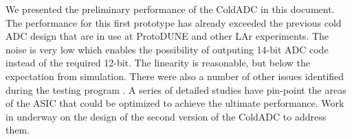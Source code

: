 \label{sec:7}


We presented the preliminary performance of the ColdADC in this document. The performance for this first prototype
has already exceeded the previous cold ADC design that are in use at ProtoDUNE and other LAr experiments. 
The noise is very low which enables the possibility of outputing 14-bit ADC code instead of the required 12-bit.
The linearity is reasonable, but below the expectation from simulation. There were also a number of other 
issues identified during the testing program . A series of detailed  studies have pin-point the 
areas of the ASIC that could be optimized to achieve the ultimate performance. Work in underway on the design 
of the second version of the ColdADC to address them.

